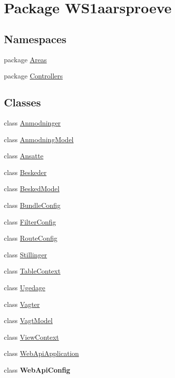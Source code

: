 \hypertarget{namespace_w_s1aarsproeve}{}\section{Package W\+S1aarsproeve}
\label{namespace_w_s1aarsproeve}
\subsection*{Namespaces}
\begin{DoxyCompactItemize}
\item 
package \hyperlink{namespace_w_s1aarsproeve_1_1_areas}{Areas}
\item 
package \hyperlink{namespace_w_s1aarsproeve_1_1_controllers}{Controllers}
\end{DoxyCompactItemize}
\subsection*{Classes}
\begin{DoxyCompactItemize}
\item 
class \hyperlink{class_w_s1aarsproeve_1_1_anmodninger}{Anmodninger}
\item 
class \hyperlink{class_w_s1aarsproeve_1_1_anmodning_model}{Anmodning\+Model}
\item 
class \hyperlink{class_w_s1aarsproeve_1_1_ansatte}{Ansatte}
\item 
class \hyperlink{class_w_s1aarsproeve_1_1_beskeder}{Beskeder}
\item 
class \hyperlink{class_w_s1aarsproeve_1_1_besked_model}{Besked\+Model}
\item 
class \hyperlink{class_w_s1aarsproeve_1_1_bundle_config}{Bundle\+Config}
\item 
class \hyperlink{class_w_s1aarsproeve_1_1_filter_config}{Filter\+Config}
\item 
class \hyperlink{class_w_s1aarsproeve_1_1_route_config}{Route\+Config}
\item 
class \hyperlink{class_w_s1aarsproeve_1_1_stillinger}{Stillinger}
\item 
class \hyperlink{class_w_s1aarsproeve_1_1_table_context}{Table\+Context}
\item 
class \hyperlink{class_w_s1aarsproeve_1_1_ugedage}{Ugedage}
\item 
class \hyperlink{class_w_s1aarsproeve_1_1_vagter}{Vagter}
\item 
class \hyperlink{class_w_s1aarsproeve_1_1_vagt_model}{Vagt\+Model}
\item 
class \hyperlink{class_w_s1aarsproeve_1_1_view_context}{View\+Context}
\item 
class \hyperlink{class_w_s1aarsproeve_1_1_web_api_application}{Web\+Api\+Application}
\item 
class {\bfseries Web\+Api\+Config}
\end{DoxyCompactItemize}
